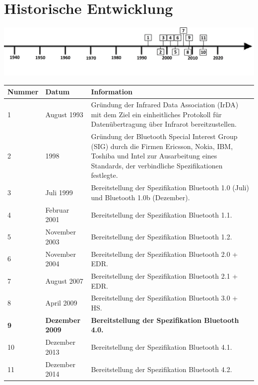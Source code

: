 \section*{Historische Entwicklung}
\includegraphics[width=\textwidth]{Kapitel/BLE/Grafiken/Zeitstrahl}
\par
\noindent
\begin{tabular}{|p{1 cm}|p{3 cm}|p{13.55 cm}|}
	\hline
	Nummer & Datum & Information \\
	\hline
	1 & August 1993 & Gründung der Infrared Data Association (IrDA) mit dem Ziel ein einheitliches Protokoll für Datenübertragung über Infrarot bereitzustellen.\\
	\hline
	2 & 1998 & Gründung der Bluetooth Special Interest Group (SIG) durch die Firmen Ericsson, Nokia, IBM, Toshiba und Intel zur Ausarbeitung eines Standards, der verbindliche Spezifikationen festlegte.\\
	\hline
	3 & Juli 1999 & Bereitstellung der Spezifikation Bluetooth 1.0 (Juli) und Bluetooth 1.0b (Dezember).\\
	\hline
	4 & Februar 2001 & Bereitstellung der Spezifikation Bluetooth 1.1.\\
	\hline
	5 & November 2003 & Bereitstellung der Spezifikation Bluetooth 1.2.\\
	\hline
	6 & November 2004 & Bereitstellung der Spezifikation Bluetooth 2.0 + EDR.\\
	\hline
	7 & August 2007 & Bereitstellung der Spezifikation Bluetooth 2.1 + EDR.\\
	\hline
	8 & April 2009 & Bereitstellung der Spezifikation Bluetooth 3.0 + HS.\\
	\hline
	\textbf{9} & \textbf{Dezember 2009} & \textbf{Bereitstellung der Spezifikation Bluetooth 4.0.}\\
	\hline
	10 & Dezember 2013 & Bereitstellung der Spezifikation Bluetooth 4.1.\\
	\hline
	11 & Dezember 2014 & Bereitstellung der Spezifikation Bluetooth 4.2.\\
	\hline
\end{tabular}
\par
